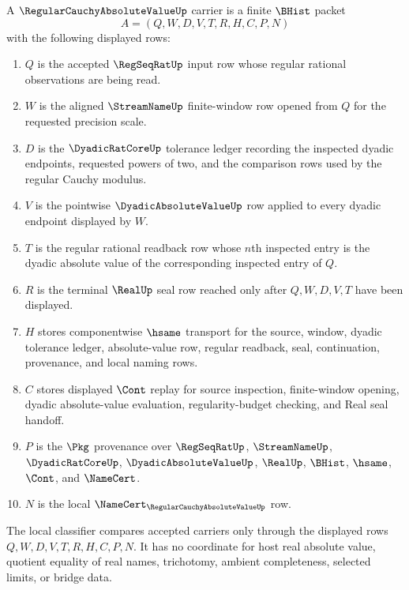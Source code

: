 \begin{definition}
\label{def:regular-cauchy-absolute-value-carrier}
A $\RegularCauchyAbsoluteValueUp$ carrier is a finite $\BHist$ packet
$$
A=(Q,W,D,V,T,R,H,C,P,N)
$$
with the following displayed rows:
\begin{enumerate}
\item $Q$ is the accepted $\RegSeqRatUp$ input row whose regular rational observations are being read.
\item $W$ is the aligned $\StreamNameUp$ finite-window row opened from $Q$ for the requested precision scale.
\item $D$ is the $\DyadicRatCoreUp$ tolerance ledger recording the inspected dyadic endpoints, requested powers of two, and the comparison rows used by the regular Cauchy modulus.
\item $V$ is the pointwise $\DyadicAbsoluteValueUp$ row applied to every dyadic endpoint displayed by $W$.
\item $T$ is the regular rational readback row whose $n$th inspected entry is the dyadic absolute value of the corresponding inspected entry of $Q$.
\item $R$ is the terminal $\RealUp$ seal row reached only after $Q,W,D,V,T$ have been displayed.
\item $H$ stores componentwise $\hsame$ transport for the source, window, dyadic tolerance ledger, absolute-value row, regular readback, seal, continuation, provenance, and local naming rows.
\item $C$ stores displayed $\Cont$ replay for source inspection, finite-window opening, dyadic absolute-value evaluation, regularity-budget checking, and Real seal handoff.
\item $P$ is the $\Pkg$ provenance over $\RegSeqRatUp$, $\StreamNameUp$, $\DyadicRatCoreUp$, $\DyadicAbsoluteValueUp$, $\RealUp$, $\BHist$, $\hsame$, $\Cont$, and $\NameCert$.
\item $N$ is the local $\NameCert_{\RegularCauchyAbsoluteValueUp}$ row.
\end{enumerate}
The local classifier compares accepted carriers only through the displayed rows $Q,W,D,V,T,R,H,C,P,N$. It has no coordinate for host real absolute value, quotient equality of real names, trichotomy, ambient completeness, selected limits, or bridge data.
\end{definition}

